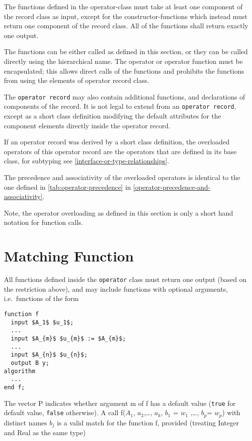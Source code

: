 The functions defined in the operator-class must take at least one
component of the record class as input, except for the
constructor-functions which instead must return one component of the
record class. All of the functions shall return exactly one output.

The functions can be either called as defined in this section, or they
can be called directly using the hierarchical name. The operator or
operator function must be encapsulated; this allows direct calls of the
functions and prohibits the functions from using the elements of
operator record class.

The \lstinline!operator record! may also contain additional functions, and
declarations of components of the record. It is not legal to extend from
an \lstinline!operator record!, except as a short class definition modifying the
default attributes for the component elements directly inside the
operator record.

If an operator record was derived by a short class definition, the
overloaded operators of this operator record are the operators that are
defined in its base class, for subtyping see \cref{interface-or-type-relationships}.

The precedence and associativity of the overloaded operators is
identical to the one defined in \cref{tab:operator-precedence} in \cref{operator-precedence-and-associativity}.

\begin{nonnormative}
Note, the operator overloading as defined in this section is
only a short hand notation for function calls.
\end{nonnormative}

\section{Matching Function}\label{matching-function}

All functions defined inside the \lstinline!operator! class must return one
output (based on the restriction above), and may include functions with
optional arguments, i.e.\ functions of the form

\begin{lstlisting}[language=modelica]
function f
  input $A_1$ $u_1$;
  ...
  input $A_{m}$ $u_{m}$ := $A_{m}$;
  ...
  input $A_{n}$ $u_{n}$;
  output B y;
algorithm
  ...
end f;
\end{lstlisting}
The vector P indicates whether argument m of f has a default value
(\lstinline!true! for default value, \lstinline!false! otherwise). A call
f($A_1$, $a_{2}$,\ldots{}, $a_{k}$,
$b_{1}$ = $w_{1}$ ,\ldots{}, $b_{p}$=
$w_{p}$) with distinct names $b_{j}$ is a valid
match for the function f, provided (treating Integer and Real as the
same type)

